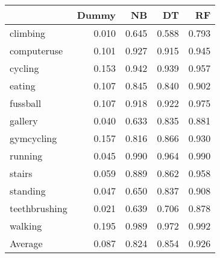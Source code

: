 \begin{tabular}{lrrrr}
\toprule
{} &  Dummy &    NB &    DT &    RF \\
\midrule
climbing      &  0.010 & 0.645 & 0.588 & 0.793 \\
computeruse   &  0.101 & 0.927 & 0.915 & 0.945 \\
cycling       &  0.153 & 0.942 & 0.939 & 0.957 \\
eating        &  0.107 & 0.845 & 0.840 & 0.902 \\
fussball      &  0.107 & 0.918 & 0.922 & 0.975 \\
gallery       &  0.040 & 0.633 & 0.835 & 0.881 \\
gymcycling    &  0.157 & 0.816 & 0.866 & 0.930 \\
running       &  0.045 & 0.990 & 0.964 & 0.990 \\
stairs        &  0.059 & 0.889 & 0.862 & 0.958 \\
standing      &  0.047 & 0.650 & 0.837 & 0.908 \\
teethbrushing &  0.021 & 0.639 & 0.706 & 0.878 \\
walking       &  0.195 & 0.989 & 0.972 & 0.992 \\
Average       &  0.087 & 0.824 & 0.854 & 0.926 \\
\bottomrule
\end{tabular}
